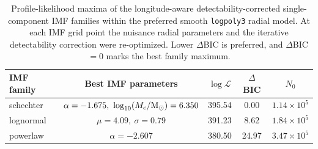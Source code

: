 \begin{table}
\caption{Profile-likelihood maxima of the longitude-aware detectability-corrected single-component IMF families within the preferred smooth \texttt{logpoly3} radial model. At each IMF grid point the nuisance radial parameters and the iterative detectability correction were re-optimized. Lower $\Delta$BIC is preferred, and $\Delta$BIC$=0$ marks the best family maximum.}
\label{tab:single_component_models}
\small
\centering
\begin{tabular}{lcccc}
\hline
IMF family & Best IMF parameters & $\log \mathcal{L}$ & $\Delta$BIC & $N_0$ \\
\hline
schechter & $\alpha=-1.675,\ \log_{10}(M_c/{\rm M}_\odot)=6.350$ & 395.54 & 0.00 & $1.14\times10^{5}$ \\
lognormal & $\mu=4.09,\ \sigma=0.79$ & 391.23 & 8.62 & $1.84\times10^{5}$ \\
powerlaw & $\alpha=-2.607$ & 380.50 & 24.97 & $3.47\times10^{5}$ \\
\hline
\end{tabular}
\end{table}
